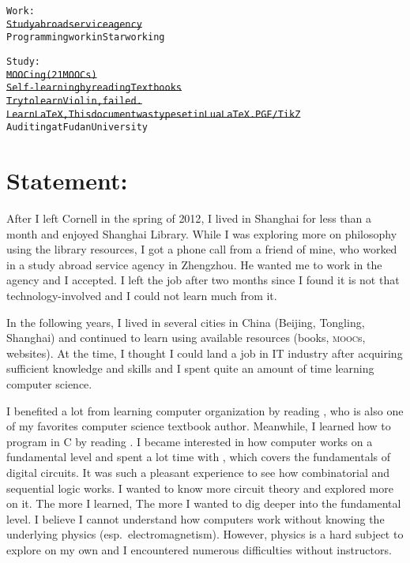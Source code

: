 


\usepackage[font={scriptsize,it}]{caption}
\usepackage{metalogo,alltt,soul,tikz,standalone,wrapfig,csquotes}
\usetikzlibrary{calc}
\usepackage{biblatex} %



\newcommand*{\onum}[1]{{\addfontfeatures{Numbers=OldStyle}#1}}
\newcommand*{\TikZ}{PGF/\kern1bpTi\kern.5bp\textit{k}Z}


	\begin{alltt}
		Work:
		\st{Study abroad service agency}
		Programming work in Starworking
		
		Study:
		\st{MOOCing (21 MOOCs)}
		\st{Self-learning by reading Textbooks}
		\st{Try to learn Violin, failed.}
		\st{Learn LaTeX, This document was typeset in LuaLaTeX. PGF/TikZ}
		Auditing at Fudan University
	\end{alltt}
	
	\section*{Statement:}
	After I left Cornell in the spring of \onum{2012}, I lived in Shanghai for less
	than a month and enjoyed Shanghai Library. While I was exploring more on
	philosophy using the library resources, I got a phone call from a friend of
	mine, who worked in a study abroad service agency in Zhengzhou. He wanted me to
	work in the agency and I accepted. I left the job after two months since I
	found it is not that technology-involved and I could not learn much from it.
	
	In the following years, I lived in several cities in China (Beijing, Tongling,
	Shanghai) and continued to learn using available resources (books, \textsc{mooc}s,
	websites). At the time, I thought I could land a job in IT industry after
	acquiring sufficient knowledge and skills and I spent quite an amount of time
	learning computer science.
	
	I benefited a lot from learning computer organization by reading
	\textcite{COA8e}, who is also one of my favorites computer science textbook
	author. Meanwhile, I learned how to program in C by reading \textcite{K&R}. I became interested in how computer works on a fundamental level and
	spent a lot time with \textcite{LCDF}, which covers the fundamentals of digital
	circuits. It was such a pleasant experience to see how combinatorial and
	sequential logic works. I wanted to know more circuit theory and explored more
	on it. The more I learned, The more I wanted to dig deeper into the fundamental
	level. I believe I cannot understand how computers work without knowing the
	underlying physics (esp.~electromagnetism). However, physics is a hard subject
	to explore on my own and I encountered numerous difficulties without
	instructors.
	
